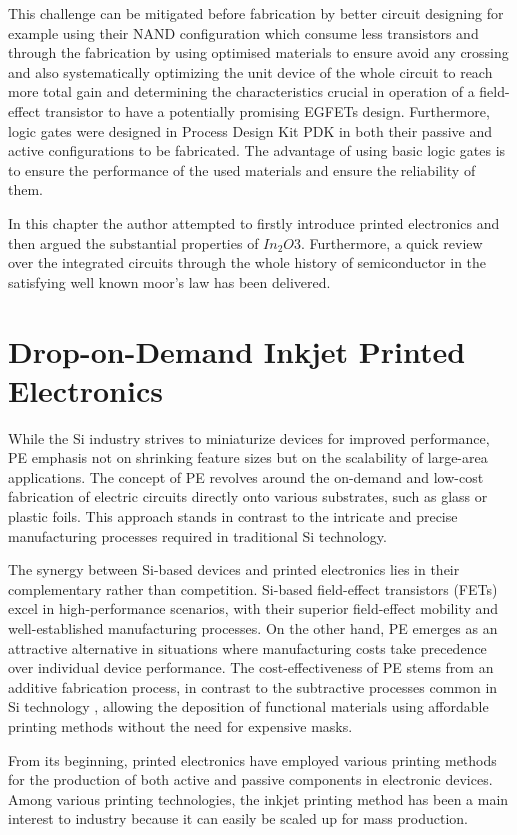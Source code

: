 This challenge can be mitigated before fabrication by better circuit designing for example using their NAND configuration which consume less transistors and through the fabrication by using optimised materials to ensure avoid any crossing and also systematically optimizing the unit device of the whole circuit to reach more total gain and determining the characteristics crucial in operation of a field-effect transistor to have a potentially promising EGFETs design.
Furthermore, logic gates were designed in Process Design Kit PDK in both their passive and active configurations to be fabricated. The advantage of using basic logic gates is to ensure the performance of the used materials and ensure the reliability of them.


In this chapter the author attempted to firstly introduce  printed electronics and then argued the substantial properties of $In_2O3$.
Furthermore, a quick review over the integrated circuits through the whole history of semiconductor in the satisfying well known moor’s law has been delivered.

\section{ Drop-on-Demand Inkjet Printed Electronics}
While the Si industry strives to miniaturize devices for improved performance, PE emphasis not on shrinking feature sizes but on the scalability of large-area applications. The concept of PE revolves around the on-demand and low-cost fabrication of electric circuits directly onto various substrates, such as glass or plastic foils. This approach stands in contrast to the intricate and precise manufacturing processes required in traditional Si technology.

The synergy between Si-based devices and printed electronics lies in their complementary rather than competition. Si-based field-effect transistors (FETs) excel in high-performance scenarios, with their superior field-effect mobility and well-established manufacturing processes. On the other hand, PE emerges as an attractive alternative in situations where manufacturing costs take precedence over individual device performance. The cost-effectiveness of PE stems from an additive fabrication process, in contrast to the subtractive processes common in Si technology , allowing the deposition of functional materials using affordable printing methods without the need for expensive masks.

From its beginning, printed electronics have employed various printing methods for the production of both active and passive components in electronic devices. Among various printing technologies, the inkjet printing method has been a main interest to industry because it can easily be scaled up for mass production.


